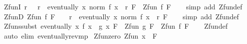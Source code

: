 \begin{isabellebody}
\isamarkupfalse%
\ ZfunI{\isacharcolon}{\kern0pt}\ {\isachardoublequoteopen}{\isacharparenleft}{\kern0pt}{\isasymAnd}r{\isachardot}{\kern0pt}\ {}\ {\isacharless}{\kern0pt}\ r\ {\isasymLongrightarrow}\ eventually\ {\isacharparenleft}{\kern0pt}{\isasymlambda}x{\isachardot}{\kern0pt}\ norm\ {\isacharparenleft}{\kern0pt}f\ x{\isacharparenright}{\kern0pt}\ {\isacharless}{\kern0pt}\ r{\isacharparenright}{\kern0pt}\ F{\isacharparenright}{\kern0pt}\ {\isasymLongrightarrow}\ Zfun\ f\ F{\isachardoublequoteclose}\isanewline
%
\isadelimproof
\ \ %
\endisadelimproof
%
\isatagproof
{}\isamarkupfalse%
\ {\isacharparenleft}{\kern0pt}simp\ add{\isacharcolon}{\kern0pt}\ Zfun{\isacharunderscore}{\kern0pt}def{\isacharparenright}{\kern0pt}%
\endisatagproof
{\isafoldproof}%
%
\isadelimproof
\isanewline
%
\endisadelimproof
\isanewline
{}\isamarkupfalse%
\ ZfunD{\isacharcolon}{\kern0pt}\ {\isachardoublequoteopen}Zfun\ f\ F\ {\isasymLongrightarrow}\ {}\ {\isacharless}{\kern0pt}\ r\ {\isasymLongrightarrow}\ eventually\ {\isacharparenleft}{\kern0pt}{\isasymlambda}x{\isachardot}{\kern0pt}\ norm\ {\isacharparenleft}{\kern0pt}f\ x{\isacharparenright}{\kern0pt}\ {\isacharless}{\kern0pt}\ r{\isacharparenright}{\kern0pt}\ F{\isachardoublequoteclose}\isanewline
%
\isadelimproof
\ \ %
\endisadelimproof
%
\isatagproof
{}\isamarkupfalse%
\ {\isacharparenleft}{\kern0pt}simp\ add{\isacharcolon}{\kern0pt}\ Zfun{\isacharunderscore}{\kern0pt}def{\isacharparenright}{\kern0pt}%
\endisatagproof
{\isafoldproof}%
%
\isadelimproof
\isanewline
%
\endisadelimproof
\isanewline
{}\isamarkupfalse%
\ Zfun{\isacharunderscore}{\kern0pt}ssubst{\isacharcolon}{\kern0pt}\ {\isachardoublequoteopen}eventually\ {\isacharparenleft}{\kern0pt}{\isasymlambda}x{\isachardot}{\kern0pt}\ f\ x\ {\isacharequal}{\kern0pt}\ g\ x{\isacharparenright}{\kern0pt}\ F\ {\isasymLongrightarrow}\ Zfun\ g\ F\ {\isasymLongrightarrow}\ Zfun\ f\ F{\isachardoublequoteclose}\isanewline
%
\isadelimproof
\ \ %
\endisadelimproof
%
\isatagproof
{}\isamarkupfalse%
\ Zfun{\isacharunderscore}{\kern0pt}def\ \isamarkupfalse%
\ {\isacharparenleft}{\kern0pt}auto\ elim{\isacharbang}{\kern0pt}{\isacharcolon}{\kern0pt}\ eventually{\isacharunderscore}{\kern0pt}rev{\isacharunderscore}{\kern0pt}mp{\isacharparenright}{\kern0pt}%
\endisatagproof
{\isafoldproof}%
%
\isadelimproof
\isanewline
%
\endisadelimproof
\isanewline
{}\isamarkupfalse%
\ Zfun{\isacharunderscore}{\kern0pt}zero{\isacharcolon}{\kern0pt}\ {\isachardoublequoteopen}Zfun\ {\isacharparenleft}{\kern0pt}{\isasymlambda}x{\isachardot}{\kern0pt}\ {}{\isacharparenright}{\kern0pt}\ F{\isachardoublequoteclose}\isanewline

\end{isabellebody}
